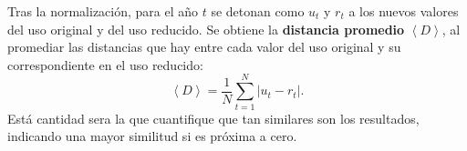 

Tras la normalización, para el año $t$ se detonan como $u_{t}$ y $r_{t}$ a los nuevos valores del uso original y del uso reducido. Se obtiene la \textbf{distancia promedio} $\left\langle D \right\rangle $, al promediar las distancias que hay entre cada valor del uso original y su correspondiente en el uso reducido: 
\begin{equation}
\left\langle D \right\rangle  = \frac{1}{N}\sum_{t=1}^{N} \left| u_{t} - r_{t} \right|  .
\label{ec.Distancia_prom}
\end{equation}
Está cantidad sera la que cuantifique que tan similares son los resultados, indicando una mayor similitud si es próxima a cero. 




